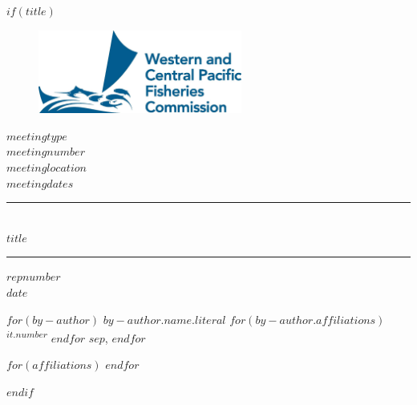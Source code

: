 $if(title)$
    \thispagestyle{empty}
    \begin{center}
        \begin{figure}
        \begin{center}
            \vspace{-2ex}
            \includegraphics[width=190pt]{static/wcpfc-logo.jpg}\\[-2ex]
        \end{center}
        \end{figure}
        \singlespace
        \textbf{\sffamily\small $meetingtype$\\$meetingnumber$}\\[3ex]
        \textsf{$meetinglocation$}\\
        \textsf{$meetingdates$}\\
        \rule{\textwidth}{0.5mm}\\
        \textbf{\sffamily $title$}\\[-1.5ex]
        \rule{\textwidth}{0.5mm}
    \end{center}

    \vspace{-1ex}
    \begin{flushright}
      \textbf{\sffamily $repnumber$}\\
      \textbf{\sffamily $date$}
    \end{flushright}
    \vspace{2in}
    \begin{center}
    $for(by-author)$
        \textbf{\sffamily $by-author.name.literal$}%
        $for(by-author.affiliations)$
            \textsuperscript{$it.number$}%
        $endfor$%
        $sep$, %
    $endfor$
    \end{center}
    
    $for(affiliations)$
    $endfor$

    \clearpage
$endif$
